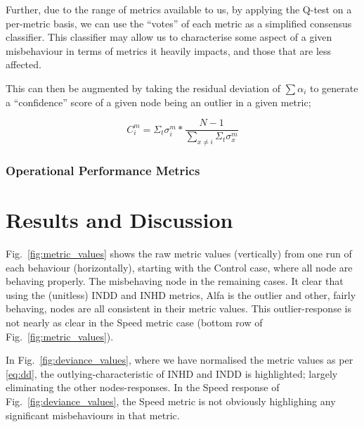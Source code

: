 \documentclass[conference]{IEEEtran}
\begin{document}
Further, due to the range of metrics available to us, by applying the Q-test on a per-metric basis, we can use the ``votes'' of each metric as a simplified consensus classifier.
This classifier may allow us to characterise some aspect of a given misbehaviour in terms of metrics it heavily impacts, and those that are less affected.

This can then be augmented by taking the residual deviation of $\sum\alpha_{i}$ to generate a ``confidence'' score of a given node being an outlier in a given metric;

\begin{equation}
  C_{i}^{m} = \Sigma_t\sigma_{i}^m * \frac{N-1}{\sum_{x\neq i}{\Sigma_t\sigma_{x}^m}}\label{eq:confidence}
\end{equation}


\subsubsection{Operational Performance Metrics}

\section{Results and Discussion}
Fig.~\ref{fig:metric_values} shows the raw metric values (vertically) from one run of each behaviour (horizontally), starting with the Control case, where all node are behaving properly.
The misbehaving node in the remaining cases.
It clear that using the (unitless) INDD and INHD metrics, Alfa is the outlier and other, fairly behaving, nodes are all consistent in their metric values.
This outlier-response is not nearly as clear in the Speed metric case (bottom row of Fig.~\ref{fig:metric_values}).

In Fig.~\ref{fig:deviance_values}, where we have normalised the metric values as per \eqref{eq:dd}, the outlying-characteristic of INHD and INDD is highlighted; largely eliminating the other nodes-responses.
In the Speed response of Fig.~\ref{fig:deviance_values}, the Speed metric is not obviously highlighing any significant misbehaviours in that metric. 
\end{document}
